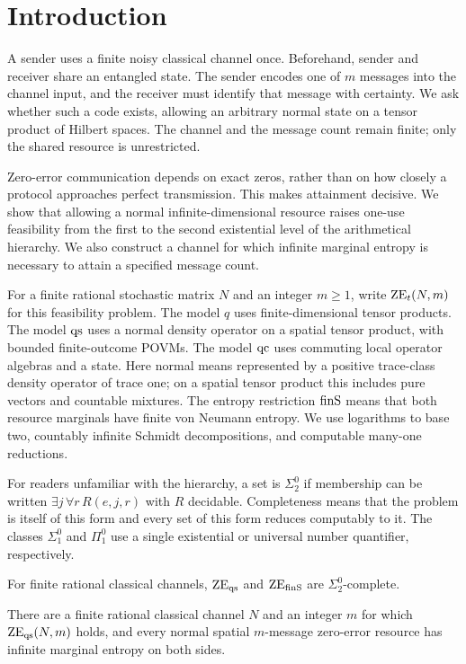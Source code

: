\section{Introduction}
A sender uses a finite noisy classical channel once. Beforehand, sender and receiver share an entangled state. The sender encodes one of $m$ messages into the channel input, and the receiver must identify that message with certainty. We ask whether such a code exists, allowing an arbitrary normal state on a tensor product of Hilbert spaces. The channel and the message count remain finite; only the shared resource is unrestricted.

Zero-error communication depends on exact zeros, rather than on how closely a protocol approaches perfect transmission. This makes attainment decisive. We show that allowing a normal infinite-dimensional resource raises one-use feasibility from the first to the second existential level of the arithmetical hierarchy. We also construct a channel for which infinite marginal entropy is necessary to attain a specified message count.

For a finite rational stochastic matrix $N$ and an integer $m\geq1$, write $\mathrm{ZE}_t(N,m)$ for this feasibility problem. The model $q$ uses finite-dimensional tensor products. The model $\mathrm{qs}$ uses a normal density operator on a spatial tensor product, with bounded finite-outcome POVMs. The model $\mathrm{qc}$ uses commuting local operator algebras and a state. Here normal means represented by a positive trace-class density operator of trace one; on a spatial tensor product this includes pure vectors and countable mixtures. The entropy restriction $\mathrm{finS}$ means that both resource marginals have finite von Neumann entropy. We use logarithms to base two, countably infinite Schmidt decompositions, and computable many-one reductions.

For readers unfamiliar with the hierarchy, a set is $\Sigma^0_2$ if membership can be written $\exists j\,\forall r\,R(e,j,r)$ with $R$ decidable. Completeness means that the problem is itself of this form and every set of this form reduces computably to it. The classes $\Sigma^0_1$ and $\Pi^0_1$ use a single existential or universal number quantifier, respectively.

\begin{theorem}\label{thm:main}
For finite rational classical channels, $\mathrm{ZE}_{\mathrm{qs}}$ and $\mathrm{ZE}_{\mathrm{finS}}$ are $\Sigma^0_2$-complete.
\end{theorem}

\begin{theorem}\label{thm:entropyonly}
There are a finite rational classical channel $N$ and an integer $m$ for which $\mathrm{ZE}_{\mathrm{qs}}(N,m)$ holds, and every normal spatial $m$-message zero-error resource has infinite marginal entropy on both sides.
\end{theorem}

